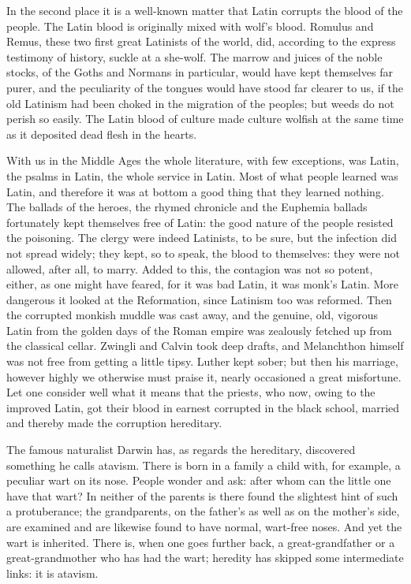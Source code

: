 \documentclass[12pt,a4paper,openany]{book}
\newcommand{\opage}[1]{\marginnote{\footnotesize\textit{[#1]}}}
\begin{document}
In the second place it is a well-known matter that Latin
corrupts the blood of the people. The Latin blood is originally
mixed with wolf's blood. Romulus and Remus, these
two first great Latinists of the world, did, according to the express
testimony of history, suckle at a she-wolf.
The marrow and juices of the noble stocks, of the Goths and Normans
in particular, would have kept themselves far purer,
and the peculiarity of the tongues would have stood far
clearer to us, if the old Latinism had been choked in
the migration of the peoples; but weeds do not perish so easily.
The Latin blood of culture made culture wolfish at
the same time as it deposited dead flesh in the hearts.

With us in the Middle Ages the whole literature, with
few exceptions, was Latin, the psalms in Latin, the whole
service in Latin. Most of what people learned
was Latin, and therefore it was at bottom a good thing that they learned
nothing. The ballads of the heroes, the rhymed chronicle and the Euphemia ballads
fortunately kept themselves free of Latin: the good
\setcounter{footnote}{0}%
\opage{124}nature of the people resisted the poisoning. The clergy were indeed
Latinists, to be sure, but the infection did not spread widely;
they kept, so to speak, the blood to themselves: they were
not allowed, after all, to marry. Added to this, the contagion
was not so potent, either, as one might have feared,
for it was bad Latin, it was monk's Latin. More dangerous
it looked at the Reformation, since Latinism
too was reformed. Then the corrupted monkish muddle
was cast away, and the genuine, old, vigorous Latin
from the golden days of the Roman empire was zealously fetched up
from the classical cellar. Zwingli and Calvin took deep
drafts, and Melanchthon himself was not free from getting
a little tipsy. Luther kept sober; but then
his marriage, however highly we otherwise must praise it,
nearly occasioned a great misfortune. Let one consider well
what it means that the priests, who now, owing to
the improved Latin, got their blood in earnest corrupted
in the black school, married and thereby made
the corruption hereditary.

The famous naturalist Darwin has, as regards
the hereditary, discovered something he calls atavism.
There is born in a family a child with, for example, a peculiar
wart on its nose. People wonder and ask:
after whom can the little one have that wart? In
neither of the parents is there found the slightest hint of such
a protuberance; the grandparents, on the father's
as well as on the mother's side, are examined and are likewise found
to have normal, wart-free noses. And yet the wart is
inherited. There is, when one goes further back, a
great-grandfather or a great-grandmother who has had the wart;
heredity has skipped some intermediate links: it
is atavism.
\end{document}
